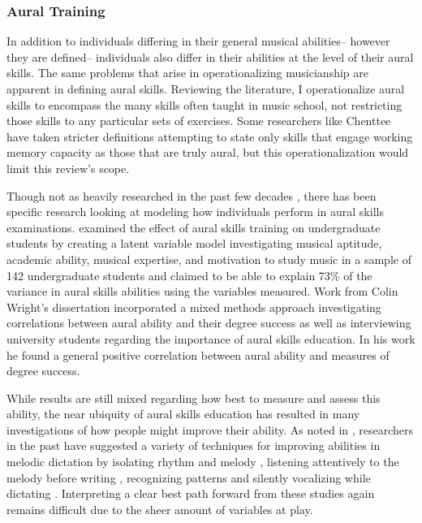 \documentclass[12pt,]{book}
\begin{document}
\hypertarget{aural-training}{%
\subsubsection{Aural Training}\label{aural-training}}

In addition to individuals differing in their general musical abilities-- however they are defined-- individuals also differ in their abilities at the level of their aural skills.
The same problems that arise in operationalizing musicianship are apparent in defining aural skills.
Reviewing the literature, I operationalize aural skills to encompass the many skills often taught in music school, not restricting those skills to any particular sets of exercises.
Some researchers like Chenttee \citep{chenetteReframingAuralSkills2019} have taken stricter definitions attempting to state only skills that engage working memory capacity as those that are truly aural, but this operationalization would limit this review's scope.

Though not as heavily researched in the past few decades \citep{furbyEffectsPeerTutoring2016}, there has been specific research looking at modeling how individuals perform in aural skills examinations.
\citet{harrisonEffectsMusicalAptitude1994} examined the effect of aural skills training on undergraduate students by creating a latent variable model investigating musical aptitude, academic ability, musical expertise, and motivation to study music in a sample of 142 undergraduate students and claimed to be able to explain 73\% of the variance in aural skills abilities using the variables measured.
Work from Colin Wright's dissertation incorporated a mixed methods approach investigating correlations between aural ability and their degree success as well as interviewing university students regarding the importance of aural skills education.
In his work he found a general positive correlation between aural ability and measures of degree success.

While results are still mixed regarding how best to measure and assess this ability, the near ubiquity of aural skills education has resulted in many investigations of how people might improve their ability.
As noted in \citet{furbyEffectsPeerTutoring2016}, researchers in the past have suggested a variety of techniques for improving abilities in melodic dictation by isolating rhythm and melody \citep{bantonRoleVisualAuditory1995, blandSightSingingMelodic1984, rootMethodicalSightSingingLessons1931}, listening attentively to the melody before writing \citep{bantonRoleVisualAuditory1995}, recognizing patterns \citep{bantonRoleVisualAuditory1995, blandSightSingingMelodic1984, rootMethodicalSightSingingLessons1931} and silently vocalizing while dictating \citep{klonoskiImprovingDictationAuralSkills2006}.
Interpreting a clear best path forward from these studies again remains difficult due to the sheer amount of variables at play.
\end{document}
